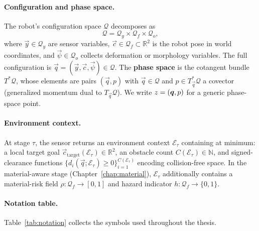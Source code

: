 \paragraph{Configuration and phase space.}
The robot's configuration space $\mathcal{Q}$ decomposes as
\begin{equation}
  \mathcal{Q} = \mathcal{Q}_y \times \mathcal{Q}_f \times \mathcal{Q}_o,
  \label{eq:config_decomp}
\end{equation}
where $\vec{y} \in \mathcal{Q}_y$ are sensor variables,
$\vec{c} \in \mathcal{Q}_f \subset \mathbb{R}^2$ is the robot pose in world
coordinates, and $\vec{\psi} \in \mathcal{Q}_o$ collects deformation or
morphology variables.
The full configuration is $\vec{q} = (\vec{y}, \vec{c}, \vec{\psi}) \in
\mathcal{Q}$.
The \textbf{phase space} is the cotangent bundle $T^*\mathcal{Q}$, whose
elements are pairs $(\vec{q}, p)$ with $\vec{q} \in \mathcal{Q}$ and
$p \in T^*_{\vec{q}}\mathcal{Q}$ a covector (generalized momentum dual to
$T_{\vec{q}}\mathcal{Q}$).
We write $z = (\boldsymbol{q}, p)$ for a generic phase-space point.

\paragraph{Environment context.}
At stage $\tau$, the sensor returns an environment context
$\mathcal{E}_\tau$ containing at minimum:
a local target goal $\vec{c}_{\mathrm{target}}(\mathcal{E}_\tau) \in \mathbb{R}^2$,
an obstacle count $C(\mathcal{E}_\tau) \in \mathbb{N}$,
and signed-clearance functions
$\{d_i(\vec{q};\mathcal{E}_\tau) \geq 0\}_{i=1}^{C(\mathcal{E}_\tau)}$
encoding collision-free space.
In the material-aware stage (Chapter~\ref{chap:material}), $\mathcal{E}_\tau$
additionally contains a material-risk field
$\rho : \mathcal{Q}_f \to [0,1]$ and hazard indicator
$h : \mathcal{Q}_f \to \{0,1\}$.

\paragraph{Notation table.}
Table~\ref{tab:notation} collects the symbols used throughout the thesis.

